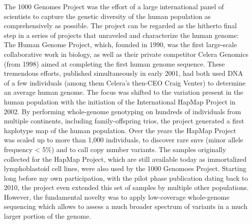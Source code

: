 The 1000 Genomes Project was the effort of a large international panel of
scientists to capture the genetic diversity of the human population as
comprehensively as possible. The project can be regarded as the hitherto final
step in a series of projects that unraveled and characterize the human genome:
The Human Genome Project, which, founded in 1990, was the first large-scale
collaborative work in biology, as well as their private competitor Celera
Genomics (from 1998) aimed at completing the first human genome sequence.
These tremendous efforts, published simultaneously in early
2001\citep{Lander2001,Venter2001}, had both used DNA of a few individuals (among
them Celera’s then-CEO Craig Venter) to determine an average human genome. The
focus was shifted to the variation present in the human population with the
initiation of the International HapMap Project in 2002. By performing
whole-genome \snv genotyping on hundreds of individuals from multiple continents,
including family-offspring trios, the project generated a first haplotype map of
the human population\citep{InternationalHapMapConsortium2005,Frazer2007,Altshuler2010}.
Over the years the HapMap Project was scaled up to more than 1,000 individuals,
to discover rare \acp{snv}  (minor allele frequency < 5\%) and to call copy number
variants. The samples originally collected for the HapMap Project, which are
still available today as immortalized lymphoblastoid cell lines, were also used
by the 1000 Genomoes Project. Starting long before my own participation, with
the pilot phase publication dating back to 2010\citep{Durbin2010}, the project
even extended this set of samples by multiple other
populations\citep{1000GenomesProjectConsortium2012}. However, the fundamental
novelty was to apply low-coverage whole-genome sequencing which allows to assess
a much broader spectrum of variants in a much larger portion of the genome.

